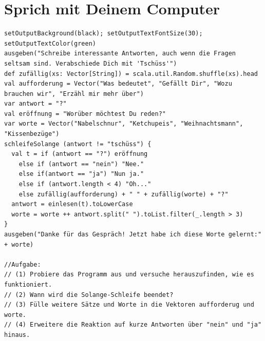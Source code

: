 \chapter{Sprich mit Deinem Computer}
\begin{lstlisting}[basicstyle={\ttfamily\fontsize{13}{16}\selectfont},numbers=none]
setOutputBackground(black); setOutputTextFontSize(30); setOutputTextColor(green)
ausgeben("Schreibe interessante Antworten, auch wenn die Fragen seltsam sind. Verabschiede Dich mit 'Tschüss'")
def zufällig(xs: Vector[String]) = scala.util.Random.shuffle(xs).head
val aufforderung = Vector("Was bedeutet", "Gefällt Dir", "Wozu brauchen wir", "Erzähl mir mehr über")
var antwort = "?"
val eröffnung = "Worüber möchtest Du reden?"
var worte = Vector("Nabelschnur", "Ketchupeis", "Weihnachtsmann", "Kissenbezüge") 
schleifeSolange (antwort != "tschüss") {
  val t = if (antwort == "?") eröffnung 
    else if (antwort == "nein") "Nee." 
    else if(antwort == "ja") "Nun ja." 
    else if (antwort.length < 4) "Oh..." 
    else zufällig(aufforderung) + " " + zufällig(worte) + "?"
  antwort = einlesen(t).toLowerCase
  worte = worte ++ antwort.split(" ").toList.filter(_.length > 3) 
} 
ausgeben("Danke für das Gespräch! Jetzt habe ich diese Worte gelernt:" + worte)

//Aufgabe:
// (1) Probiere das Programm aus und versuche herauszufinden, wie es funktioniert.
// (2) Wann wird die Solange-Schleife beendet?
// (3) Fülle weitere Sätze und Worte in die Vektoren aufforderug und worte.
// (4) Erweitere die Reaktion auf kurze Antworten über "nein" und "ja" hinaus.
\end{lstlisting}
        
